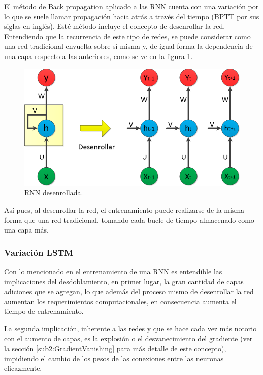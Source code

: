             El método de Back propagation aplicado a las RNN cuenta con una variación por lo que se suele llamar propagación hacia atrás a través del tiempo (BPTT por sus siglas en inglés)\cite{Werbos1990BPTT}. Esté método incluye el concepto de desenrollar la red. Entendiendo que la recurrencia de este tipo de redes, se puede considerar como una red tradicional envuelta sobre sí misma y, de igual forma la dependencia de una capa respecto a las anteriores, como se ve en la figura \ref{fig:RNN-unfold}. 
            
            \begin{figure}[ht!]
            	\centering
            	\includegraphics[width=0.7\linewidth]{imgs/02-Referential/02-arch-rnn-unfold.png}
            	\caption[RNN desenrollada]{RNN desenrollada.}
        	    \label{fig:RNN-unfold}
            \end{figure}%
            
            Así pues, al desenrollar la red, el entrenamiento puede realizarse de la misma forma que una red tradicional, tomando cada bucle de tiempo almacenado como una capa más.
            
        \subsubsection{Variación LSTM}
            
            Con lo mencionado en el entrenamiento de una RNN es entendible las implicaciones del desdoblamiento, en primer lugar, la gran cantidad de capas adiciones que se agregan, lo que además del proceso mismo de desenrollar la red aumentan los requerimientos computacionales, en consecuencia aumenta el tiempo de entrenamiento.
            
            La segunda implicación, inherente a las redes y que se hace cada vez más notorio con el aumento de capas, es la explosión o el desvanecimiento del gradiente \cite{Hochreiter2001gradient} (ver la sección \ref{sub2:GradientVanishing} para más detalle de este concepto), impidiendo el cambio de los pesos de las conexiones entre las neuronas eficazmente.
        
